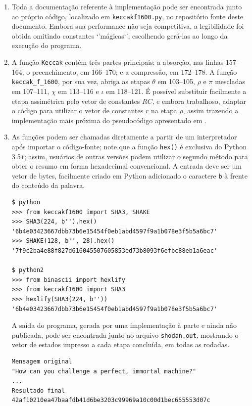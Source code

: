 \documentclass{article}
\begin{document}
\begin{enumerate}[label=(\alph*)]

\item Toda a documentação referente à implementação pode ser encontrada junto
ao próprio código, localizado em \texttt{keccakf1600.py}, no repositório fonte
deste documento. Embora sua performance não seja competitiva, a legibilidade
foi obtida omitindo constantes `'mágicas`', escolhendo gerá-las ao longo da
execução do programa.

\item A função \texttt{Keccak} contém três partes principais: a absorção, nas
linhas 157--164; o preenchimento, em 166--170; e a compressão, em 172--178. A
função \texttt{keccak\_f\_1600}, por sua vez, abriga as etapas $\theta$ em
103--105, $\rho$ e $\pi$ mescladas em 107--111, $\chi$ em 113--116 e $\iota$ em
118--121. É possível substituir facilmente a etapa assimétrica pelo vetor de
constantes $RC$, e embora trabalhoso, adaptar o código para utilizar o vetor de
constantes $r$ na etapa $\rho$, assim trazendo a implementação mais próxima do
pseudocódigo apresentado em \cite{KeccakImplementation}.

\item As funções podem ser chamadas diretamente a partir de um interpretador
após importar o código-fonte; note que a função \texttt{hex()} é exclusiva do
Python 3.5\texttt{+}; assim, usuários de outras versões podem utilizar o
segundo método para obter o resumo em forma hexadecimal convencional. A entrada
deve ser um vetor de bytes, facilmente criado em Python adicionado o caractere
\texttt{b} à frente do conteúdo da palavra.

\begin{verbatim}
$ python
>>> from keccakf1600 import SHA3, SHAKE
>>> SHA3(224, b'').hex()
'6b4e03423667dbb73b6e15454f0eb1abd4597f9a1b078e3f5b5a6bc7'
>>> SHAKE(128, b'', 28).hex()
'7f9c2ba4e88f827d616045507605853ed73b8093f6efbc88eb1a6eac'

$ python2
>>> from binascii import hexlify
>>> from keccakf1600 import SHA3
>>> hexlify(SHA3(224, b''))
'6b4e03423667dbb73b6e15454f0eb1abd4597f9a1b078e3f5b5a6bc7'
\end{verbatim}

A saída do programa, gerada por uma implementação à parte e ainda não
publicada, pode ser encontrada junto ao arquivo \texttt{shodan.out}, mostrando
o vetor de estados impresso a cada etapa concluída, em todas as rodadas.

\begin{verbatim}
Mensagem original
"How can you challenge a perfect, immortal machine?"
...
Resultado final
42af10210ea47baafdb41d6be3203c99969a10c00d1bec655553d07c
\end{verbatim}

\end{enumerate}
\end{document}
